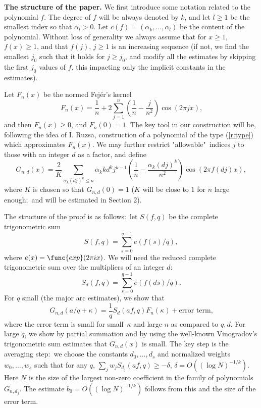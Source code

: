 \documentclass{amsart}
\numberwithin {equation}{section}
\begin{document}
\textbf{The structure of the paper. }We first introduce some notation
related to the polynomial $f$. The degree of $f$ will be always denoted by $k $, and let $l\geq 1$ be the smallest index so that $\alpha _{l}>0$. Let $c(f)=(\alpha _{k},...,\alpha _{l})$ be the content of the polynomial.
Without loss of generality we always assume that for $x\geq 1$, $f(x)\geq 1$, and that $f(j)$, $j\geq 1$ is an increasing sequence (if not, we find the
smallest $j_{0}$ such that it holds for $j\geq j_{0}$, and modify all the
estimates by skipping the first $j_{0}$ values of $f$, this impacting only
the implicit constants in the estimates).

Let $F_{n}(x)$ be the normed Fej\'{e}r's kernel 
\begin{equation*}
F_{n}(x)=\frac{1}{n}+2\sum_{j=1}^{n}\left( \frac{1}{n}-\frac{j}{n^{2}}\right) \cos (2\pi jx){\text{,}}
\end{equation*}and then $F_{n}(x)\geq 0$, and $F_{n}(0)=1$. The key tool in our
construction will be, following the idea of I. Ruzsa, construction of a
polynomial of the type (\ref{r:type}) which approximates $F_{n}(x)$. We may
further restrict "allowable"\ indices $j$ to those with an integer $d$ as a
factor, and define 
\begin{equation}
G_{n,d}(x)=\frac{2}{K}\sum_{\alpha _{k}(dj)^{k}\leq n}\alpha
_{k}kd^{k}j^{k-1}\left( \frac{1}{n}-\frac{\alpha _{k}(dj)^{k}}{n^{2}}\right)
\cos (2\pi f(dj)x),  \label{r:defg}
\end{equation}where $K$ is chosen so that $G_{n,d}(0)=1$ ($K$ will be close to $1$ for $n$
large enough;\ and will be estimated in Section 2).

The structure of the proof is as follows:\ let $S(f,q)$ be the complete
trigonometric sum 
\begin{equation}
S(f,q)=\sum_{s=0}^{q-1}e(f(s)/q),  \label{r:complete}
\end{equation}where $e(x)=\func{exp}(2\pi ix)$. We will need the reduced complete
trigonometric sum over the multipliers of an integer $d$: 
\begin{equation*}
S_{d}(f,q)=\sum_{s=0}^{q-1}e(f(ds)/q).
\end{equation*}For $q$ small (the major arc estimates), we show that 
\begin{equation}
G_{n,d}(a/q+\kappa )=\frac{1}{q}S_{d}(af,q)F_{n}(\kappa )+{\text{error term,}}  \label{r:key}
\end{equation}where the error term is small for small\ $\kappa $ and large $n$ as compared
to $q,d$. For large $q$, we show by partial summation and by using the
well-known Vinogradov's trigonometric sum estimates that $G_{n,d}(x)$ is
small. The key step is the averaging step:\ we choose the constants $d_{0},...,d_{s}$ and normalized weights $w_{0},\ldots ,w_{s}$ such that for
any $q$, $\sum_{j}w_{j}S_{d_{j}}(af,q)\geq -\delta $, $\delta =O((\log
N)^{-1/k})$. Here $N$ is the size of the largest non-zero coefficient in the
family of polynomials $G_{n,d_{j}}$. The estimate $b_{0}=O((\log N)^{-1/k})$
follows from this and the size of the error term.
\end{document}
